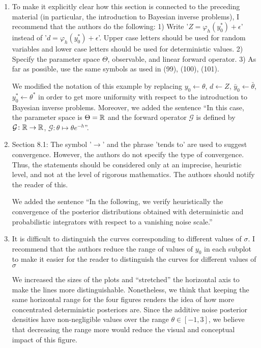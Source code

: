\documentclass[10pt]{article}
\begin{document}
\begin{enumerate}
	\item 
	\begin{itquote}
		To make it explicitly clear how this section is connected to the preceding material (in particular, the introduction to Bayesian inverse problems), I recommend that the authors do the following: 1) Write '$Z=\varphi_h(y_0^\ast)+\epsilon$' instead of '$d= \varphi_h(y_0^\ast)+\epsilon$'. Upper case letters should be used for random variables and lower case letters should be used for deterministic values. 2) Specify the parameter space $\Theta$, observable, and linear forward operator. 3) As far as possible, use the same symbols as used in (99), (100), (101).
	\end{itquote}
	We modified the notation of this example by replacing $y_0 \leftarrow \theta$, $d \leftarrow Z$, $\bar y_0 \leftarrow \bar \theta$, $y_0^* \leftarrow \theta^*$ in order to get more uniformity with respect to the introduction to Bayesian inverse problems. Moreover, we added the sentence ``In this case, the parameter space is $\Theta = \mathbb{R}$ and the forward operator $\mathcal G$ is defined by $\mathcal G\colon \mathbb{R} \to \mathbb{R}$, $\mathcal G \colon \theta \mapsto \theta e^{-h}$''. 
	\item
	\begin{itquote}
		Section 8.1: The symbol '$\to$' and the phrase 'tends to' are used to suggest convergence. However, the authors do not specify the type of convergence. Thus, the statements should be considered only at an imprecise, heuristic level, and not at the level of rigorous mathematics. The authors should notify the reader of this.
	\end{itquote}
	We added the sentence ``In the following, we verify heuristically the convergence of the posterior distributions obtained with deterministic and probabilistic integrators with respect to a vanishing noise scale.''
	\item 
	\begin{itquote}
		It is difficult to distinguish the curves corresponding to different values of $\sigma$. I recommend that the authors reduce the range of values of $y_0$ in each subplot to make it easier for the reader to distinguish the curves for different values of $\sigma$
	\end{itquote}
	We increased the sizes of the plots and ``stretched'' the horizontal axis to make the lines more distinguishable. Nonetheless, we think that keeping the same horizontal range for the four figures renders the idea of how more concentrated deterministic posteriors are. Since the additive noise posterior densities have non-negligible values over the range $\theta \in [-1, 3]$, we believe that decreasing the range more would reduce the visual and conceptual impact of this figure.

\end{enumerate}
\end{document}
